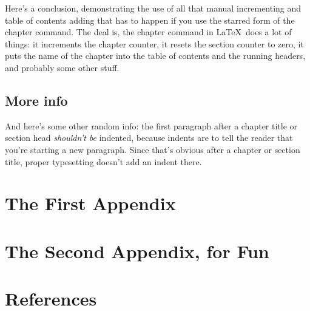 \documentclass[12pt,twoside]{reedthesis}
\begin{document}
  
   
  \setcounter{chapter}{2} \setcounter{section}{0}
  
  Here's a conclusion, demonstrating the use of all that manual
  incrementing and table of contents adding that has to happen if you use
  the starred form of the chapter command. The deal is, the chapter
  command in \LaTeX~does a lot of things: it increments the chapter
  counter, it resets the section counter to zero, it puts the name of the
  chapter into the table of contents and the running headers, and probably
  some other stuff.
  
  \section{More info}
  
  And here's some other random info: the first paragraph after a chapter
  title or section head \emph{shouldn't be} indented, because indents are
  to tell the reader that you're starting a new paragraph. Since that's
  obvious after a chapter or section title, proper typesetting doesn't add
  an indent there.
  
  \appendix
  \chapter{The First Appendix} \chapter{The Second Appendix, for Fun}

  \backmatter
  \chapter{References}
  \printbibliography[heading=bibintoc, heading=none]

\end{document}
